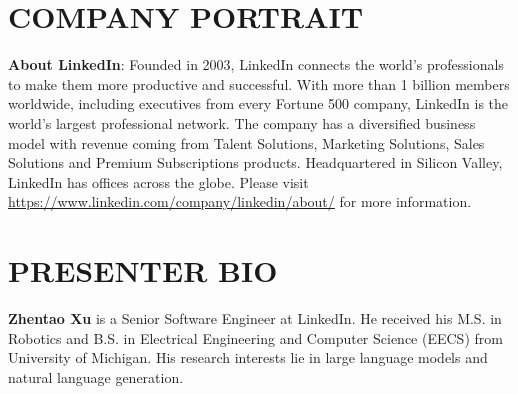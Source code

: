 \documentclass[sigconf]{acmart}
\begin{document}
\section{COMPANY PORTRAIT}
 
 \textbf{About LinkedIn}: Founded in 2003, LinkedIn connects the world’s professionals to make them more productive and successful. With more than 1 billion members worldwide, including executives from every Fortune 500 company, LinkedIn is the world’s largest professional network. The company has a diversified business model with revenue coming from Talent Solutions, Marketing Solutions, Sales Solutions and Premium Subscriptions products. Headquartered in Silicon Valley, LinkedIn has offices across the globe. Please visit \href{https://www.linkedin.com/company/linkedin/about/}{https://www.linkedin.com/company/linkedin/about/} for more information. 


	\section{PRESENTER BIO}
\textbf{Zhentao Xu} is a Senior Software Engineer at LinkedIn. He received his M.S. in Robotics and B.S. in Electrical Engineering and Computer Science (EECS) from University of Michigan. His research interests lie in large language models and natural language generation.



\balance

        

\appendix
\end{document}
